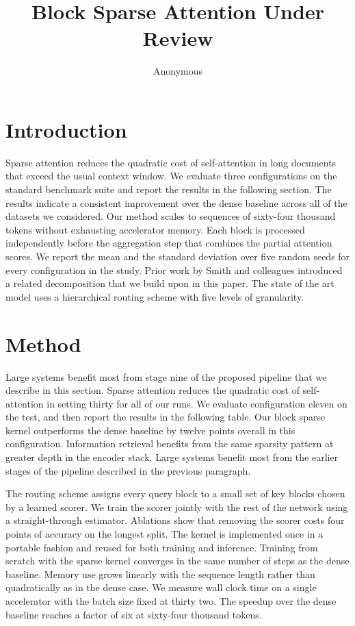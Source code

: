 \documentclass[10pt,twocolumn]{article}
\title{Block Sparse Attention Under Review}
\author{Anonymous}
\date{}
\newcommand{\s}[1]{#1}
\begin{document}
\maketitle

\section{Introduction}

\s{Sparse attention reduces the quadratic cost of self-attention in long documents that exceed the usual context window.}
\s{We evaluate three configurations on the standard benchmark suite and report the results in the following section.}
\s{The results indicate a consistent improvement over the dense baseline across all of the datasets we considered.}
\s{Our method scales to sequences of sixty-four thousand tokens without exhausting accelerator memory.}
\s{Each block is processed independently before the aggregation step that combines the partial attention scores.}
\s{We report the mean and the standard deviation over five random seeds for every configuration in the study.}
\s{Prior work by Smith and colleagues introduced a related decomposition that we build upon in this paper.}
\s{The state of the art model uses a hierarchical routing scheme with five levels of granularity.}

\section{Method}

\s{Large systems benefit most from stage nine of the proposed pipeline that we describe in this section.}
\s{Sparse attention reduces the quadratic cost of self-attention in setting thirty for all of our runs.}
\s{We evaluate configuration eleven on the test, and then report the results in the following table.}
\s{Our block sparse kernel outperforms the dense baseline by twelve points overall in this configuration.}
\s{Information retrieval benefits from the same sparsity pattern at greater depth in the encoder stack.}
\s{Large systems benefit most from the earlier stages of the pipeline described in the previous paragraph.}

\s{The routing scheme assigns every query block to a small set of key blocks chosen by a learned scorer.}
\s{We train the scorer jointly with the rest of the network using a straight-through estimator.}
\s{Ablations show that removing the scorer costs four points of accuracy on the longest split.}
\s{The kernel is implemented once in a portable fashion and reused for both training and inference.}
\s{Training from scratch with the sparse kernel converges in the same number of steps as the dense baseline.}
\s{Memory use grows linearly with the sequence length rather than quadratically as in the dense case.}
\s{We measure wall clock time on a single accelerator with the batch size fixed at thirty two.}
\s{The speedup over the dense baseline reaches a factor of six at sixty-four thousand tokens.}
\end{document}
